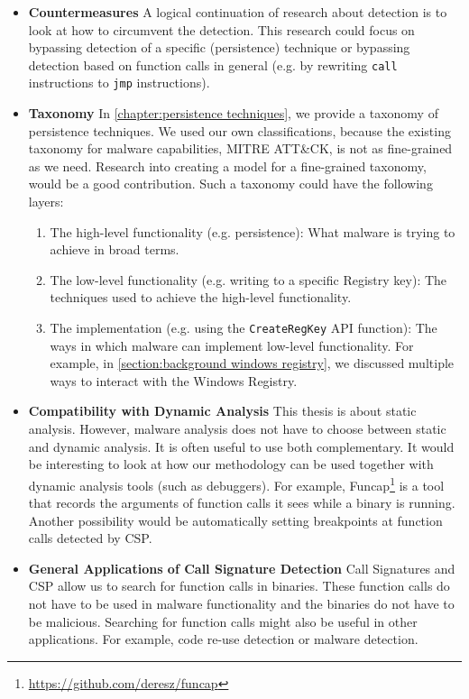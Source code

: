 \begin{itemize}
    \item \textbf{Countermeasures} A logical continuation of research about detection is to look at how to circumvent the detection. This research could focus on bypassing detection of a specific (persistence) technique or bypassing detection based on function calls in general (e.g. by rewriting \texttt{call} instructions to \texttt{jmp} instructions).

    \item \textbf{Taxonomy} In \autoref{chapter:persistence techniques}, we provide a taxonomy of persistence techniques. We used our own classifications, because the existing taxonomy for malware capabilities, MITRE ATT\&CK, is not as fine-grained as we need. Research into creating a model for a fine-grained taxonomy, would be a good contribution. Such a taxonomy could have the following layers:
    \begin{enumerate}
        \item The high-level functionality (e.g. persistence): What malware is trying to achieve in broad terms.

        \item The low-level functionality (e.g. writing to a specific Registry key): The techniques used to achieve the high-level functionality.

        \item The implementation (e.g. using the \texttt{CreateRegKey} API function): The ways in which malware can implement low-level functionality. For example, in \autoref{section:background windows registry}, we discussed multiple ways to interact with the Windows Registry.
    \end{enumerate}

    \item \textbf{Compatibility with Dynamic Analysis} This thesis is about static analysis. However, malware analysis does not have to choose between static and dynamic analysis. It is often useful to use both complementary. It would be interesting to look at how our methodology can be used together with dynamic analysis tools (such as debuggers). For example, Funcap\footnote{\tiny \url{https://github.com/deresz/funcap}} is a tool that records the arguments of function calls it sees while a binary is running. Another possibility would be automatically setting breakpoints at function calls detected by CSP.

    \item \textbf{General Applications of Call Signature Detection} Call Signatures and CSP allow us to search for function calls in binaries. These function calls do not have to be used in malware functionality and the binaries do not have to be malicious. Searching for function calls might also be useful in other applications. For example, code re-use detection or malware detection.
\end{itemize}
